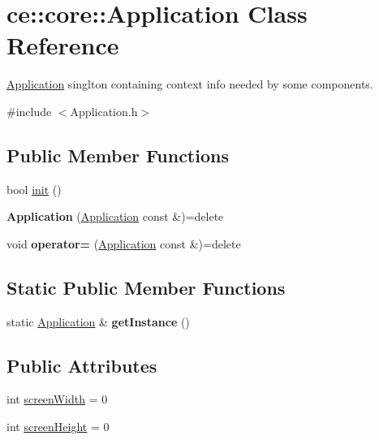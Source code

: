 \hypertarget{classce_1_1core_1_1_application}{}\section{ce\+:\+:core\+:\+:Application Class Reference}
\label{classce_1_1core_1_1_application}


\hyperlink{classce_1_1core_1_1_application}{Application} singlton containing context info needed by some components.  




{\ttfamily \#include $<$Application.\+h$>$}

\subsection*{Public Member Functions}
\begin{DoxyCompactItemize}
\item 
bool \hyperlink{classce_1_1core_1_1_application_ad93435a68fa6eb317d85a3465f45d0d5}{init} ()
\item 
\mbox{\label{classce_1_1core_1_1_application_a8e18666e2174bb3bbc372a9370e41870}} 
{\bfseries Application} (\hyperlink{classce_1_1core_1_1_application}{Application} const \&)=delete
\item 
\mbox{\label{classce_1_1core_1_1_application_aff549aad9b728fa601c5620df6ad2968}} 
void {\bfseries operator=} (\hyperlink{classce_1_1core_1_1_application}{Application} const \&)=delete
\end{DoxyCompactItemize}
\subsection*{Static Public Member Functions}
\begin{DoxyCompactItemize}
\item 
\mbox{\label{classce_1_1core_1_1_application_aa2b9f2c00cdebf63ead970bff2e58519}} 
static \hyperlink{classce_1_1core_1_1_application}{Application} \& {\bfseries get\+Instance} ()
\end{DoxyCompactItemize}
\subsection*{Public Attributes}
\begin{DoxyCompactItemize}
\item 
int \hyperlink{classce_1_1core_1_1_application_a0ba59c070c6163986b246bd4927ca1a3}{screen\+Width} = 0
\item 
int \hyperlink{classce_1_1core_1_1_application_a4b3734ba6626a5a3db7b08069077ea42}{screen\+Height} = 0
\end{DoxyCompactItemize}


